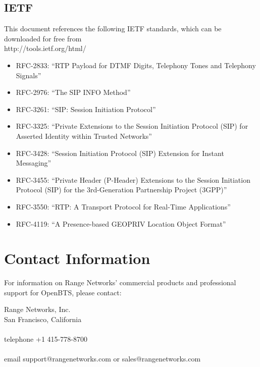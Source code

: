 \documentclass[11pt,openany]{book}
\begin{document}
\subsection{IETF}
This document references the following IETF standards, which can be downloaded for free from \\

http://tools.ietf.org/html/ \\

\begin{itemize}
	\item RFC-2833: ``RTP Payload for DTMF Digits, Telephony Tones and Telephony Signals''
	\item RFC-2976: ``The SIP INFO Method''
	\item RFC-3261: ``SIP: Session Initiation Protocol''
	\item RFC-3325: ``Private Extensions to the Session Initiation Protocol (SIP) for Asserted Identity within Trusted Networks''
	\item RFC-3428: ``Session Initiation Protocol (SIP) Extension for Instant Messaging''
	\item RFC-3455: ``Private Header (P-Header) Extensions to the Session Initiation Protocol (SIP) for the 3rd-Generation Partnership Project (3GPP)''
	\item RFC-3550: ``RTP: A Transport Protocol for Real-Time Applications''
	\item RFC-4119: ``A Presence-based GEOPRIV Location Object Format''
\end{itemize}



\section{Contact Information}
\label{sec:contact}
For information on Range Networks' commercial products and professional support for OpenBTS, please contact:

Range Networks, Inc. \\
San Francisco, California\\
\\
telephone +1 415-778-8700\\
\\
email support@rangenetworks.com or sales@rangenetworks.com\\
\end{document}
